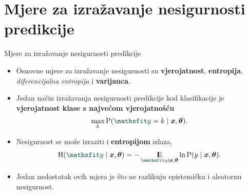 \documentclass{beamer}
\begin{document}
\section{Mjere za izražavanje nesigurnosti predikcije}

\begin{frame}{Mjere za izražavanje nesigurnosti predikcije}
\begin{itemize}
	\item Osnovne mjere za izražavanje nesigurnosti su \textbf{vjerojatnost}, \textbf{entropija}, \emph{diferencijalna entropija} i \textbf{varijanca}. \item Jedan način izražavanja nesigurnosti predikcije kod klasifikacije je \textbf{vjerojatnost klase s najvećom vjerojatnošću}
	\begin{align}
	\max_k \P(\rvar y=k\mid\vec x,\vec\theta) \text{.}
	\end{align}
	\item Nesigurnost se može izraziti i \textbf{entropijom} izlaza,
	\begin{align}
	\H(\rvar y\mid\vec x,\vec\theta)=-\E_{\rvar y\mid\vec x,\vec\theta}\ln\P\del{y\mid\vec x,\vec\theta} \text{.}
	\end{align}
	\item Jedan nedostatak ovih mjera je što ne razlikuju epistemičku i aleatornu nesigurnost.
\end{itemize}
\end{frame}
\end{document}
